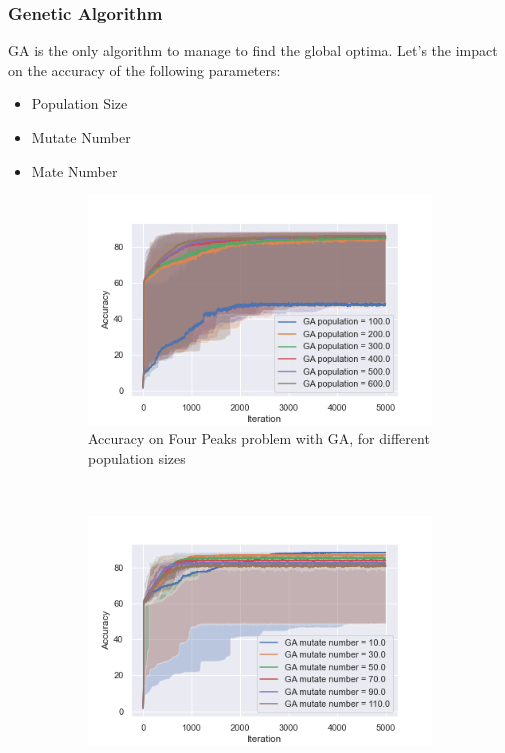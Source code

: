 \documentclass[10pt]{article}
\begin{document}
			\subsubsection*{Genetic Algorithm}
				GA is the only algorithm to manage to find the global optima. Let's the impact on the accuracy of the following parameters:
				\begin{itemize}
					\item Population Size
					\item Mutate Number
					\item Mate Number
				\end{itemize}

				\begin{figure}[h]
					\centering
					\begin{subfigure}[t]{0.32\columnwidth}
						\centering
						\includegraphics[width=\linewidth]{../graphics/four_peaks_GA_Iteration_Error_GA_population.png}
						\caption{Accuracy on Four Peaks problem with GA, for different population sizes}
						\label{fp:ga_pop}
					\end{subfigure}
					~
					\begin{subfigure}[t]{0.32\columnwidth}
						\centering
						\includegraphics[width=\linewidth]{../graphics/four_peaks_GA_Iteration_Error_GA_mutate_number.png}

\end{subfigure}
\end{figure}
\end{document}

